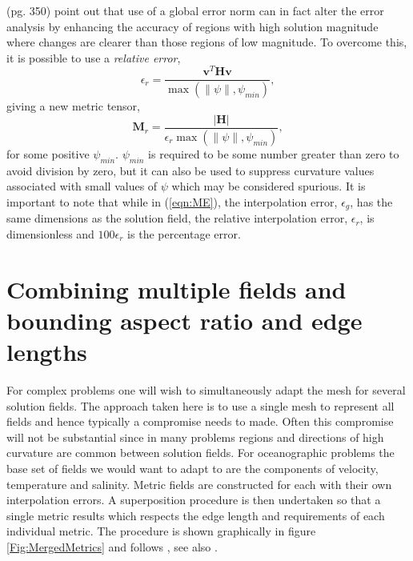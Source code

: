 \cite{george1998} (pg. 350) point out that use of a global error norm
can in fact alter the error analysis by enhancing the accuracy of
regions with high solution magnitude where changes are clearer than
those regions of low magnitude. To overcome this, it is possible to
use a {\it relative error},
\begin{equation*}\label{eqn:relative_error_3D}
  \epsilon_r=\frac{\pmb{v}^T \pmb{H} \pmb{v}}{\max(\|\psi\|, \psi_{min})},
\end{equation*}
giving a new metric tensor,
\begin{equation*}\label{eqn:relative_metric}
  \pmb{M}_r = \frac{\vert\pmb{H}\vert}{\epsilon_r\max(\|\psi\|, \psi_{min})},
\end{equation*}
for some positive $\psi_{min}$. $\psi_{min}$ is required to be some
number greater than zero to avoid division by zero, but it can also be
used to suppress curvature values associated with small values of
$\psi$ which may be considered spurious. It is important to note that
while in (\ref{eqn:ME}), the interpolation error, $\epsilon_g$, has
the same dimensions as the solution field, the relative interpolation
error, $\epsilon_r$, is dimensionless and $100\epsilon_r$ is the
percentage error.


\section{Combining multiple fields and bounding aspect ratio and edge lengths}

For complex problems one will wish to simultaneously adapt the mesh
for several solution fields. The approach taken here is to use a
single mesh to represent all fields and hence typically a compromise
needs to made. Often this compromise will not be substantial since in
many problems regions and directions of high curvature are common
between solution fields. For oceanographic problems the base set of
fields we would want to adapt to are the components of velocity,
temperature and salinity. Metric fields are constructed for each with
their own interpolation errors. A superposition procedure is then
undertaken so that a single metric results which respects the edge
length and requirements of each individual metric. The procedure is
shown graphically in figure \ref{Fig:MergedMetrics} and follows
\cite{pain2001}, see also \cite{castrodiaz1997,george1998}.

